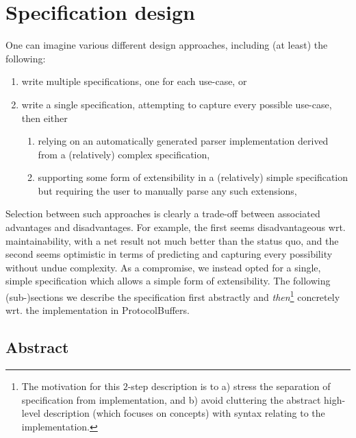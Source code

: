 \documentclass[10pt,a4paper]{llncs}
\begin{document}
\section{Specification design}

One can imagine various different design approaches, including (at least) 
the following:

\begin{enumerate}
\item write multiple specifications, one for each use-case,
      or
\item write a single specification, attempting to capture every possible 
      use-case, then either

      \begin{enumerate}
      \item relying on an automatically generated parser implementation 
            derived from a (relatively) complex specification,
      \item supporting some form of extensibility in a (relatively) simple
            specification but requiring the user to manually parse any such 
            extensions,
      \end{enumerate}
\end{enumerate}

\noindent
Selection between such approaches is clearly a trade-off between associated
advantages and disadvantages.  For example, the first seems disadvantageous 
wrt. maintainability, with a net result not much better than the status quo,
and the second seems optimistic in terms of predicting and capturing every 
possibility without undue complexity.  As a compromise, we instead opted for 
a single, simple specification which allows a simple form of extensibility.  
The following (sub-)sections we describe the specification first abstractly 
and {\em then}\footnote{
The motivation for this $2$-step description is to a) stress the separation
of specification from implementation, and b) avoid cluttering the abstract
high-level description (which focuses on concepts) with syntax relating to 
the implementation.
} concretely wrt. the implementation in {\sf ProtocolBuffers}.


\subsection{Abstract}
\end{document}
